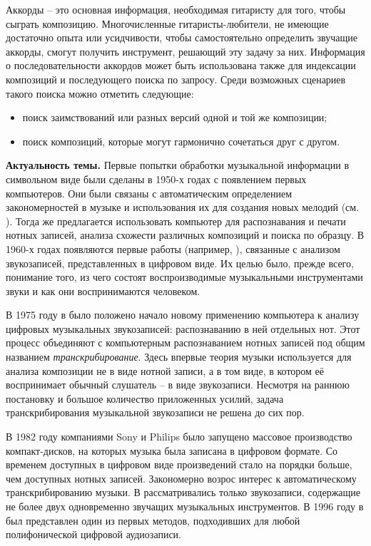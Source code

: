 Аккорды -- это основная информация, необходимая гитаристу для того, чтобы
сыграть композицию. Многочисленные гитаристы-любители, не имеющие достаточно
опыта или усидчивости, чтобы самостоятельно определить звучащие аккорды, смогут
получить инструмент, решающий эту задачу за них. Информация о последовательности
аккордов может быть использована также для индексации композиций и последующего
поиска по запросу. Среди возможных сценариев такого поиска можно отметить
следующие:
\begin{itemize}
  \item поиск заимствований или разных версий одной и той же композиции;
  \item поиск композиций, которые могут гармонично сочетаться друг с другом.
\end{itemize}

\textbf{Актуальность темы.} Первые попытки обработки музыкальной информации в
символьном виде были сделаны в 1950-х годах с появлением первых компьютеров.
Они были связаны с автоматическим определением закономерностей в музыке и
использования их для создания новых мелодий (см. \cite{Schueler2005}). Тогда же
предлагается использовать компьютер для распознавания и печати нотных записей,
анализа схожести различных композиций и поиска по образцу. В 1960-х годах
появляются первые работы (например, \cite{Freedman1967}), связанные с анализом
звукозаписей, представленных в цифровом виде. Их целью было, прежде всего,
понимание того, из чего состоят воспроизводимые музыкальными инструментами звуки
и как они воспринимаются человеком.

В 1975 году в \cite{Moorer1975} было положено начало новому применению
компьютера к анализу цифровых музыкальных звукозаписей: распознаванию в ней
отдельных нот. Этот процесс объединяют с компьютерным распознаванием нотных
записей под общим названием \emph{транскрибирование}. Здесь впервые теория
музыки используется для анализа композиции не в виде нотной записи, а в том
виде, в котором её воспринимает обычный слушатель -- в виде звукозаписи.
Несмотря на раннюю постановку и большое количество приложенных усилий, задача
транскрибирования музыкальной звукозаписи не решена до сих пор.

В 1982 году компаниями Sony и Philips было запущено массовое производство
компакт-дисков, на которых музыка была записана в цифровом формате. Со временем
доступных в цифровом виде произведений стало на порядки больше, чем доступных
нотных записей. Закономерно возрос интерес к автоматическому транскрибированию
музыки. В \cite{Moorer1975} рассматривались только звукозаписи, содержащие не
более двух одновременно звучащих музыкальных инструментов. В 1996 году в
\cite{Martin1996} был представлен один из первых методов, подходивших для любой
полифонической цифровой аудиозаписи.

